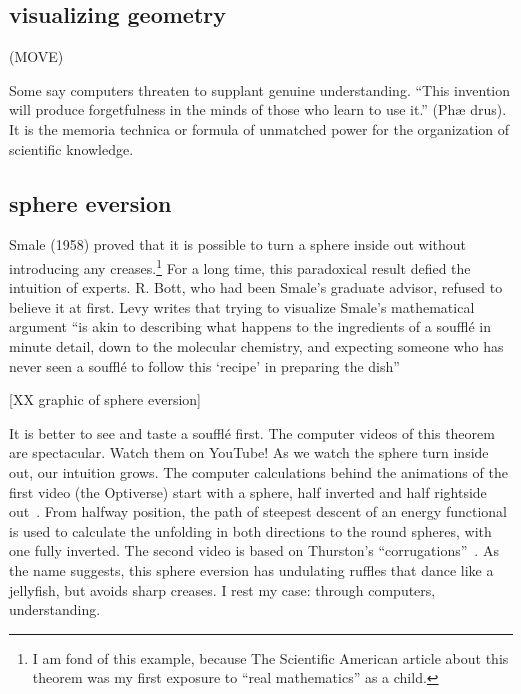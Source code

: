 \documentclass{llncs}
\begin{document}
\subsection{visualizing geometry}

(MOVE)

Some say computers threaten to supplant genuine
understanding.  ``This invention will produce
forgetfulness in the minds of those who learn to use it.'' (Ph\ae
drus).  
It is the memoria technica or formula of unmatched power for the
organization of scientific knowledge.


\subsection{sphere eversion}







Smale (1958) proved that it is possible to turn a sphere inside out
without introducing any creases.\footnote{I am fond of this example,
because The Scientific American
  article \cite{Phi66} about this theorem was my first exposure to ``real
  mathematics'' as a child.}  For a long time, this paradoxical result
defied the intuition of experts.  R. Bott, who had been Smale's
graduate advisor, refused to believe it at first.  Levy writes that
trying to visualize Smale's mathematical argument ``is akin to
describing what happens to the ingredients of a souffl\'e in minute
detail, down to the molecular chemistry, and expecting someone who has
never seen a souffl\'e to follow this `recipe' in preparing the
dish''~\cite{Le95}

[XX graphic of sphere eversion]

It is better to see and taste a souffl\'e first.  The computer videos
of this theorem are spectacular.  Watch them on YouTube!  As we watch
the sphere turn inside out, our intuition grows.  The computer
calculations behind the animations of the first video (the Optiverse)
start with a sphere, half inverted and half rightside out~\cite{SFL}.  From
halfway position, the path of steepest descent of an energy functional is
used to calculate the unfolding in both directions to the round spheres,
with one fully inverted.  The second video is based on Thurston's
``corrugations''~\cite{LMM}. As the name suggests, this sphere eversion has
undulating ruffles that dance like a jellyfish, but avoids sharp
creases.  I rest my case: through computers, understanding.
\end{document}
